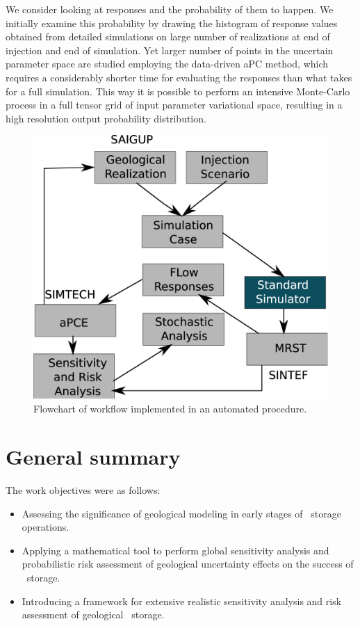 We consider looking at responses and the probability of them to happen. We
initially examine this probability by drawing the histogram of response values
obtained from detailed simulations on large number of realizations at end of injection and end of simulation.
Yet larger number of points in the uncertain parameter space are studied
employing the data-driven aPC method, which requires a considerably shorter time
for evaluating the responses than what takes for a full simulation. This way it is possible to perform an intensive
Monte-Carlo process in a full tensor grid of input parameter variational space,
resulting in a high resolution output probability distribution.


\begin{figure}[thb]
  \centering
  \includegraphics[width=0.65 \linewidth]{./figurer/ENCL} 
  \caption{Flowchart of workflow implemented in an automated procedure.}
  \label{fig:encl}
%
\end{figure}

\section{General summary}
\label{sec:generalSummary}

The work objectives were as follows:
\begin{itemize}
\item Assessing the significance of geological modeling in early stages of \coo\ storage operations.
\item Applying a mathematical tool to perform global sensitivity analysis and probabilistic risk assessment of geological uncertainty effects on the success of \coo\ storage.
\item Introducing a framework for extensive realistic sensitivity analysis and risk assessment of geological \coo\ storage.
\end{itemize}

